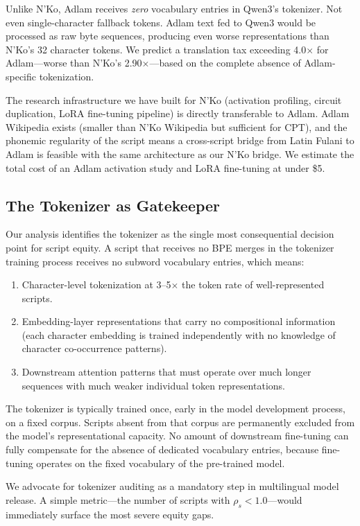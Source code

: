 \documentclass[11pt]{article}
\begin{document}
Unlike N'Ko, Adlam receives \emph{zero} vocabulary entries in Qwen3's tokenizer.
Not even single-character fallback tokens.
Adlam text fed to Qwen3 would be processed as raw byte sequences, producing even worse representations than N'Ko's 32 character tokens.
We predict a translation tax exceeding 4.0$\times$ for Adlam---worse than N'Ko's 2.90$\times$---based on the complete absence of Adlam-specific tokenization.

The research infrastructure we have built for N'Ko (activation profiling, circuit duplication, LoRA fine-tuning pipeline) is directly transferable to Adlam.
Adlam Wikipedia exists (smaller than N'Ko Wikipedia but sufficient for CPT), and the phonemic regularity of the script means a cross-script bridge from Latin Fulani to Adlam is feasible with the same architecture as our N'Ko bridge.
We estimate the total cost of an Adlam activation study and LoRA fine-tuning at under \$5.

\subsection{The Tokenizer as Gatekeeper}

Our analysis identifies the tokenizer as the single most consequential decision point for script equity.
A script that receives no BPE merges in the tokenizer training process receives no subword vocabulary entries, which means:
\begin{enumerate}
\item Character-level tokenization at 3--5$\times$ the token rate of well-represented scripts.
\item Embedding-layer representations that carry no compositional information (each character embedding is trained independently with no knowledge of character co-occurrence patterns).
\item Downstream attention patterns that must operate over much longer sequences with much weaker individual token representations.
\end{enumerate}

The tokenizer is typically trained once, early in the model development process, on a fixed corpus.
Scripts absent from that corpus are permanently excluded from the model's representational capacity.
No amount of downstream fine-tuning can fully compensate for the absence of dedicated vocabulary entries, because fine-tuning operates on the fixed vocabulary of the pre-trained model.

We advocate for tokenizer auditing as a mandatory step in multilingual model release.
A simple metric---the number of scripts with $\rho_s < 1.0$---would immediately surface the most severe equity gaps.
\end{document}
